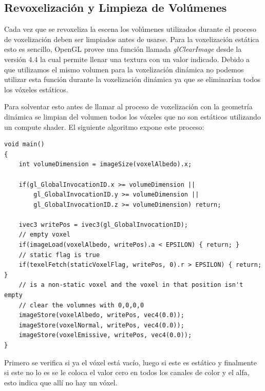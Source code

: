 \subsection{Revoxelización y Limpieza de Volúmenes}
Cada vez que se revoxeliza la escena los volúmenes utilizados durante el proceso de voxelización deben ser limpiados antes de usarse. Para la voxelización estática esto es sencillo, OpenGL provee una función llamada \emph{glClearImage} desde la versión 4.4 la cual permite llenar una textura con un valor indicado. Debido a que utilizamos el mismo volumen para la voxelización dinámica no podemos utilizar esta función durante la voxelización dinámica ya que se eliminarían todos los vóxeles estáticos.

Para solventar esto antes de llamar al proceso de voxelización con la geometría dinámica se limpian del volumen todos los vóxeles que no son estáticos utilizando un compute shader. El siguiente algoritmo expone este proceso:
\\
\begin{lstlisting}[caption={Limpieza de vóxeles no estáticos.}, label=ClearVoxels]
void main()
{
    int volumeDimension = imageSize(voxelAlbedo).x;

	if(gl_GlobalInvocationID.x >= volumeDimension ||
		gl_GlobalInvocationID.y >= volumeDimension ||
		gl_GlobalInvocationID.z >= volumeDimension) return;

    ivec3 writePos = ivec3(gl_GlobalInvocationID);
    // empty voxel
    if(imageLoad(voxelAlbedo, writePos).a < EPSILON) { return; }
    // static flag is true
    if(texelFetch(staticVoxelFlag, writePos, 0).r > EPSILON) { return; }
    // is a non-static voxel and the voxel in that position isn't empty
    // clear the volumnes with 0,0,0,0
    imageStore(voxelAlbedo, writePos, vec4(0.0));
    imageStore(voxelNormal, writePos, vec4(0.0));
    imageStore(voxelEmissive, writePos, vec4(0.0));
}
\end{lstlisting}
Primero se verifica si ya el vóxel está vacío, luego si este es estático y finalmente si este no lo es se le coloca el valor cero en todos los canales de color y el alfa, esto indica que allí no hay un vóxel.
